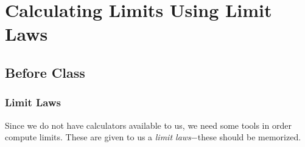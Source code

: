 \documentclass[notes]{subfiles}
\begin{document}
	\fancyhead[LO,RE]{\bfseries \currentname}
	\fancyfoot[C]{{}}
	\fancyfoot[RO,LE]{\large \thepage}	%

\section*{Calculating Limits Using Limit Laws}\label{cs16}
	\subsection*{Before Class}
	\subsubsection*{Limit Laws}
		Since we do not have calculators available to us, we need some tools in order compute limits.  These are given to us a \emph{limit laws}$-$these should be memorized.
		
\end{document}
